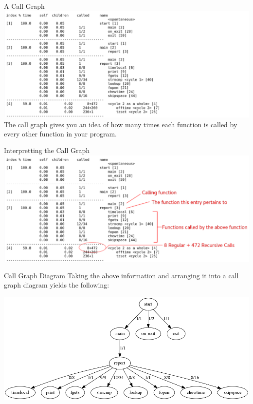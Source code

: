 \documentclass[11pt]{beamer}
\begin{document}
\begin{frame}[fragile=singleslide]{A Call Graph}
\center
\includegraphics[scale=0.28]{CallGraph1.png}
\flushleft
The call graph gives you an idea of how many times each function is called by every other function in your program.  
\end{frame}


\begin{frame}{Interpretting the Call Graph}
\center
\includegraphics[scale=0.28]{CallGraph2.png}
\end{frame}

\begin{frame}{Call Graph Diagram}
Taking the above information and arranging it into a call graph diagram yields the following:

\center
\includegraphics[scale=0.33]{callgraph.png}
\end{frame}
\end{document}
